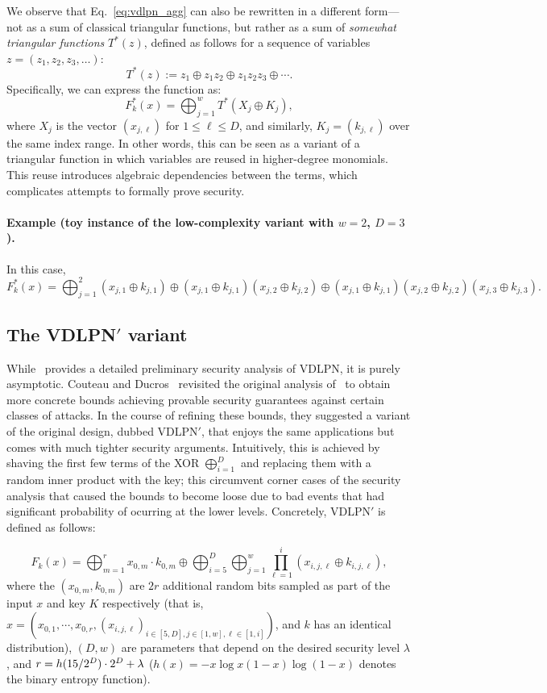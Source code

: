 We observe that Eq.~\eqref{eq:vdlpn_agg} can also be rewritten in a different form—not as a sum of classical triangular functions, but rather as a sum of \emph{somewhat triangular functions} \( T^*(z) \), defined as follows for a sequence of variables \( z = (z_1, z_2, z_3, \dots) \):
\[
    T^*(z) := z_1 \oplus z_1 z_2 \oplus z_1 z_2 z_3 \oplus \cdots.
\]
Specifically, we can express the function as:
\[
    F^*_k(x) = \bigoplus_{j=1}^w T^*(X_j \oplus K_j),
\]
where \( X_j \) is the vector \( (x_{j,\ell}) \) for \( 1 \leq \ell \leq D \), and similarly, \( K_j = (k_{j,\ell}) \) over the same index range. In other words, this can be seen as a variant of a triangular function in which variables are reused in higher-degree monomials.  This reuse introduces algebraic dependencies between the terms, which complicates attempts to formally prove security.


\paragraph{Example (toy instance of the low-complexity variant with $w = 2$, $D = 3$).}
In this case, 
\[
F^*_k(x) = \bigoplus_{j = 1}^2 (x_{j,1} \oplus k_{j,1}) \oplus (x_{j,1}\oplus k_{j,1})(x_{j,2} \oplus k_{j,2}) \oplus (x_{j,1}\oplus k_{j,1})(x_{j,2}\oplus k_{j,2})(x_{j,3}\oplus k_{j,3}).
\]

\subsection{The {\sf VDLPN}$'$ variant}

While~\cite{FOCS:BCGIKS20} provides a detailed preliminary security analysis of {\sf VDLPN}, it is purely asymptotic. Couteau and Ducros~\cite{PKC:CouDuc23} revisited the original analysis of~\cite{FOCS:BCGIKS20} to obtain more concrete bounds achieving provable security guarantees against certain classes of attacks. In the course of refining these bounds, they suggested a variant of the original design, dubbed {\sf VDLPN}$'$, that enjoys the same applications but comes with much tighter security arguments. Intuitively, this is achieved by shaving the first few terms of the XOR $\bigoplus_{i=1}^D$ and replacing them with a random inner product with the key; this circumvent corner cases of the security analysis that caused the bounds to become loose due to bad events that had significant probability of ocurring at the lower levels. Concretely, {\sf VDLPN}$'$ is defined as follows:

\begin{equation} \label{eq:vdlpn*}
    F_k(x) = \bigoplus_{m=1}^{r} x_{0,m}\cdot k_{0,m} \oplus \bigoplus_{i=5}^D \bigoplus_{j=1}^w \prod_{\ell=1}^i \left(x_{i,j,\ell} \oplus k_{i,j,\ell}\right),
\end{equation}
where the $(x_{0,m}, k_{0,m})$ are $2r$ additional random bits sampled as part of the input $x$ and key $K$ respectively (that is, $x = (x_{0,1}, \cdots, x_{0,r}, (x_{i,j,\ell})_{i\in[5,D], j\in[1,w],\ell\in[1,i]})$, and $k$ has an identical distribution), $(D,w)$ are parameters that depend on the desired security level $\lambda$, and $r = h(15/2^D)\cdot 2^D + \lambda$ ($h(x) = -x\log x (1-x)\log(1-x)$ denotes the binary entropy function). 

